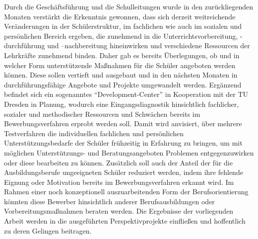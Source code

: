 Durch die Geschäftsführung und die Schulleitungen wurde in den zurückliegenden Monaten verstärkt die Erkenntnis gewonnen, dass sich derzeit weitreichende Veränderungen in der Schülerstruktur, im fachlichen wie auch im sozialen und persönlichen Bereich ergeben, die zunehmend in die Unterrichtsvorbereitung, -durchführung und –nachbereitung hineinwirken und verschiedene Ressourcen der Lehrkräfte zunehmend binden. Daher gab es bereits Überlegungen, ob und in welcher Form unterstützende Maßnahmen für die Schüler angeboten werden können. Diese sollen vertieft und ausgebaut und in den nächsten Monaten in durchführungsfähige Angebote und Projekte umgewandelt werden. Ergänzend befindet sich ein sogenanntes "`Development-Center"' in Kooperation mit der TU Dresden in Planung, wodurch eine Eingangsdiagnostik hinsichtlich fachlicher, sozialer und methodischer Ressourcen und Schwächen bereits im Bewerbungsverfahren erprobt werden soll. Damit wird anvisiert, über mehrere Testverfahren die individuellen fachlichen und persönlichen Unterstützungsbedarfe der Schüler frühzeitig in Erfahrung zu bringen, um mit möglichen Unterstützungs- und Beratungsangeboten Problemen entgegenzuwirken oder diese bearbeiten zu können. Zusätzlich soll auch der Anteil der für die Ausbildungsberufe ungeeigneten Schüler reduziert werden, indem ihre fehlende Eignung oder Motivation bereits im Bewerbungsverfahren erkannt wird. Im Rahmen einer noch konzeptionell auszuarbeitenden Form der Berufsorientierung könnten diese Bewerber hinsichtlich anderer Berufsausbildungen oder Vorbereitungsmaßnahmen beraten werden. Die Ergebnisse der vorliegenden Arbeit werden in die ausgeführten Perspektivprojekte einfließen und hoffentlich zu deren Gelingen beitragen. 